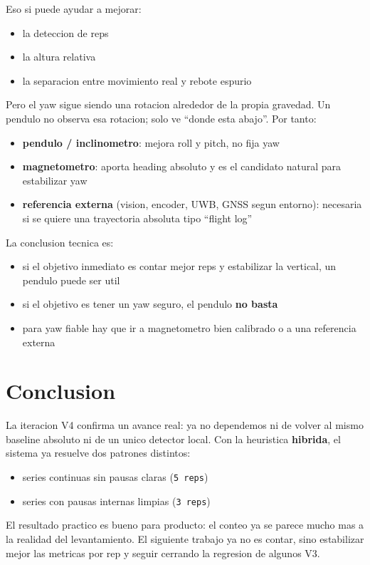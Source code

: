 ﻿\documentclass[11pt,a4paper]{article}
\begin{document}
Eso si puede ayudar a mejorar:
\begin{itemize}[leftmargin=14pt]
  \item la deteccion de reps
  \item la altura relativa
  \item la separacion entre movimiento real y rebote espurio
\end{itemize}

Pero el yaw sigue siendo una rotacion alrededor de la propia gravedad. Un pendulo no observa esa rotacion; solo ve ``donde esta abajo''. Por tanto:
\begin{itemize}[leftmargin=14pt]
  \item \textbf{pendulo / inclinometro}: mejora roll y pitch, no fija yaw
  \item \textbf{magnetometro}: aporta heading absoluto y es el candidato natural para estabilizar yaw
  \item \textbf{referencia externa} (vision, encoder, UWB, GNSS segun entorno): necesaria si se quiere una trayectoria absoluta tipo ``flight log''
\end{itemize}

La conclusion tecnica es:
\begin{itemize}[leftmargin=14pt]
  \item si el objetivo inmediato es contar mejor reps y estabilizar la vertical, un pendulo puede ser util
  \item si el objetivo es tener un yaw seguro, el pendulo \textbf{no basta}
  \item para yaw fiable hay que ir a magnetometro bien calibrado o a una referencia externa
\end{itemize}

\section*{Conclusion}
La iteracion V4 confirma un avance real: ya no dependemos ni de volver al mismo baseline absoluto ni de un unico detector local. Con la heuristica \textbf{hibrida}, el sistema ya resuelve dos patrones distintos:
\begin{itemize}[leftmargin=14pt]
  \item series continuas sin pausas claras (\texttt{5 reps})
  \item series con pausas internas limpias (\texttt{3 reps})
\end{itemize}

El resultado practico es bueno para producto: el conteo ya se parece mucho mas a la realidad del levantamiento. El siguiente trabajo ya no es contar, sino estabilizar mejor las metricas por rep y seguir cerrando la regresion de algunos V3.
\end{document}
